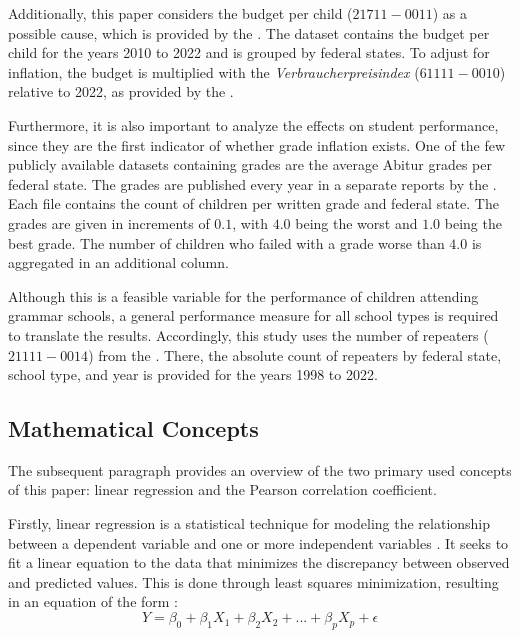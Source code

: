 Additionally, this paper considers the budget per child (\href{https://www-genesis.destatis.de/genesis//online?operation=table&code=21711-0011&bypass=true&levelindex=0&levelid=1706352648560#abreadcrumb}{$21711-0011$}) as a possible cause, which is provided  by the \citeauthor{statistische_bundesamt_statistisches_2024}. The dataset contains the budget per child for the years 2010 to 2022 and is grouped by federal states. To adjust for inflation, the budget is multiplied with the \textit{Verbraucherpreisindex} (\href{https://www-genesis.destatis.de/genesis//online?operation=table&code=61111-0010&bypass=true&levelindex=0&levelid=1706352769529#abreadcrumb}{$61111-0010$}) relative to 2022, as provided by the \citeauthor{statistische_bundesamt_statistisches_2024}. 


Furthermore, it is also important to analyze the  effects on student performance, since they are the first indicator of whether grade inflation exists. One of the few publicly available datasets containing grades are the average Abitur grades per federal state. The grades are published every year in a separate reports by the \citeauthor{kultusminister_konferenz_abiturnoten_nodate}. Each file contains the count of children per written grade and federal state. The grades are given in increments of $0.1$, with $4.0$  being the worst and $1.0$ being the best grade. The number of children who failed with a grade worse than $4.0$ is aggregated in an additional column. 

Although this is a feasible variable for the performance of children attending grammar schools, a general performance measure for all school types is required to translate the results. Accordingly, this study uses the number of repeaters (\href{https://www-genesis.destatis.de/genesis//online?operation=table&code=21111-0014&bypass=true&levelindex=0&levelid=1706352887288#abreadcrumb}{$21111-0014$}) from the \citeauthor{statistische_bundesamt_statistisches_2024}. There, the absolute count of repeaters by federal state, school type, and year is provided for the years 1998 to 2022.

\subsection{Mathematical Concepts}
The subsequent paragraph provides an overview of the two primary used concepts of this paper: linear regression and the Pearson correlation coefficient.

Firstly, linear regression is a statistical technique for modeling the relationship between a dependent variable and one or more independent variables \cite{james_introduction_2021}. It seeks to fit a linear equation to the data that minimizes the discrepancy between observed and predicted values. This is done through least squares minimization, resulting in an equation of the form \cite{james_introduction_2021}:
\begin{equation}
    Y = \beta_0 + \beta_1 X_1 + \beta_2 X_2 +  ...+ \beta_p X_p + \epsilon 
\end{equation}

